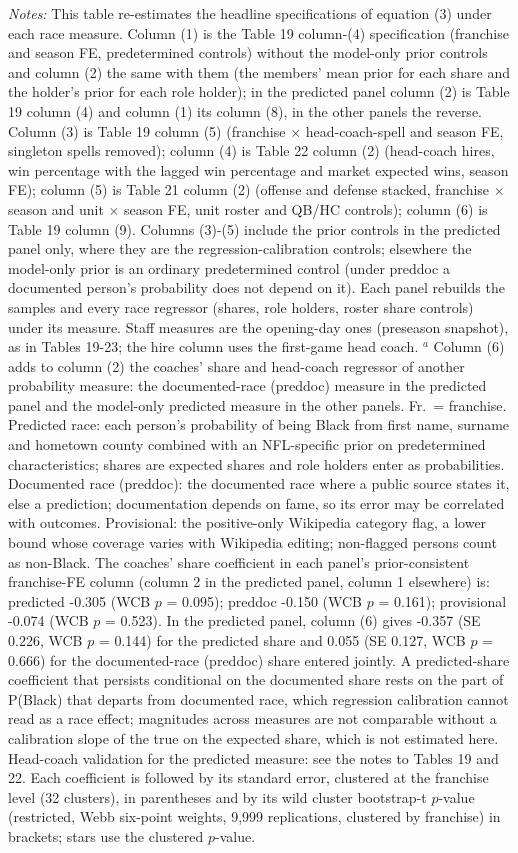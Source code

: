 {\footnotesize
\noindent\textit{Notes:} This table re-estimates the headline specifications of equation (3) under each race measure. Column (1) is the Table 19 column-(4) specification (franchise and season FE, predetermined controls) without the model-only prior controls and column (2) the same with them (the members' mean prior for each share and the holder's prior for each role holder); in the predicted panel column (2) is Table 19 column (4) and column (1) its column (8), in the other panels the reverse. Column (3) is Table 19 column (5) (franchise $\times$ head-coach-spell and season FE, singleton spells removed); column (4) is Table 22 column (2) (head-coach hires, win percentage with the lagged win percentage and market expected wins, season FE); column (5) is Table 21 column (2) (offense and defense stacked, franchise $\times$ season and unit $\times$ season FE, unit roster and QB/HC controls); column (6) is Table 19 column (9). Columns (3)-(5) include the prior controls in the predicted panel only, where they are the regression-calibration controls; elsewhere the model-only prior is an ordinary predetermined control (under preddoc a documented person's probability does not depend on it). Each panel rebuilds the samples and every race regressor (shares, role holders, roster share controls) under its measure. Staff measures are the opening-day ones (preseason snapshot), as in Tables 19-23; the hire column uses the first-game head coach. $^a$ Column (6) adds to column (2) the coaches' share and head-coach regressor of another probability measure: the documented-race (preddoc) measure in the predicted panel and the model-only predicted measure in the other panels. Fr.\ = franchise. Predicted race: each person's probability of being Black from first name, surname and hometown county combined with an NFL-specific prior on predetermined characteristics; shares are expected shares and role holders enter as probabilities. Documented race (preddoc): the documented race where a public source states it, else a prediction; documentation depends on fame, so its error may be correlated with outcomes. Provisional: the positive-only Wikipedia category flag, a lower bound whose coverage varies with Wikipedia editing; non-flagged persons count as non-Black. The coaches' share coefficient in each panel's prior-consistent franchise-FE column (column 2 in the predicted panel, column 1 elsewhere) is: predicted -0.305 (WCB $p$ = 0.095); preddoc -0.150 (WCB $p$ = 0.161); provisional -0.074 (WCB $p$ = 0.523). In the predicted panel, column (6) gives -0.357 (SE 0.226, WCB $p$ = 0.144) for the predicted share and 0.055 (SE 0.127, WCB $p$ = 0.666) for the documented-race (preddoc) share entered jointly. A predicted-share coefficient that persists conditional on the documented share rests on the part of P(Black) that departs from documented race, which regression calibration cannot read as a race effect; magnitudes across measures are not comparable without a calibration slope of the true on the expected share, which is not estimated here. Head-coach validation for the predicted measure: see the notes to Tables 19 and 22. Each coefficient is followed by its standard error, clustered at the franchise level (32 clusters), in parentheses and by its wild cluster bootstrap-t $p$-value (restricted, Webb six-point weights, 9,999 replications, clustered by franchise) in brackets; stars use the clustered $p$-value.
\par}

